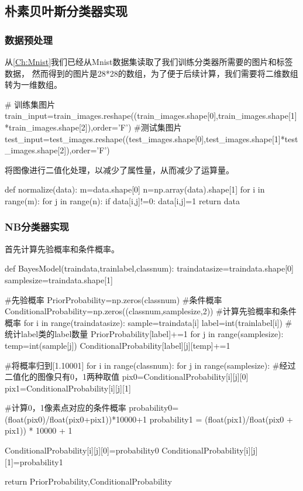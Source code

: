 \subsection{朴素贝叶斯分类器实现}
\subsubsection{数据预处理}
从\ref{Ch:Mnist}我们已经从Mnist数据集读取了我们训练分类器所需要的图片和标签数据，
然而得到的图片是28*28的数组，为了便于后续计算，我们需要将二维数组转为一维数组。
\begin{python}
  # 训练集图片
  train_input=train_images.reshape((train_images.shape[0],train_images.shape[1]*train_images.shape[2]),order='F')
  #测试集图片
  test_input=test_images.reshape((test_images.shape[0],test_images.shape[1]*test_images.shape[2]),order='F')
\end{python}

将图像进行二值化处理，以减少了属性量，从而减少了运算量。
\begin{python}
  def normalize(data):
    m=data.shape[0]
    n=np.array(data).shape[1]
    for i in range(m):
        for j in range(n):
            if data[i,j]!=0:
                data[i,j]=1
    return data
\end{python}

\subsubsection{NB分类器实现}
首先计算先验概率和条件概率。
\begin{python}
  def BayesModel(traindata,trainlabel,classnum):
    traindatasize=traindata.shape[0]
    samplesize=traindata.shape[1]
    
    #先验概率
    PriorProbability=np.zeros(classnum)
    #条件概率
    ConditionalProbability=np.zeros((classnum,samplesize,2))
    #计算先验概率和条件概率
    for i in range(traindatasize):
        sample=traindata[i]
        label=int(trainlabel[i])
        #统计label类的label数量
        PriorProbability[label]+=1
        for j in range(samplesize):
            temp=int(sample[j])
            ConditionalProbability[label][j][temp]+=1
    
    #将概率归到[1.10001]
    for i in range(classnum):
        for j in range(samplesize):
            #经过二值化的图像只有0，1两种取值
            pix0=ConditionalProbability[i][j][0]
            pix1=ConditionalProbability[i][j][1]

            #计算0，1像素点对应的条件概率
            probability0=(float(pix0)/float(pix0+pix1))*10000+1
            probability1 = (float(pix1)/float(pix0 + pix1)) * 10000 + 1

            ConditionalProbability[i][j][0]=probability0
            ConditionalProbability[i][j][1]=probability1
    
    return PriorProbability,ConditionalProbability
\end{python}

